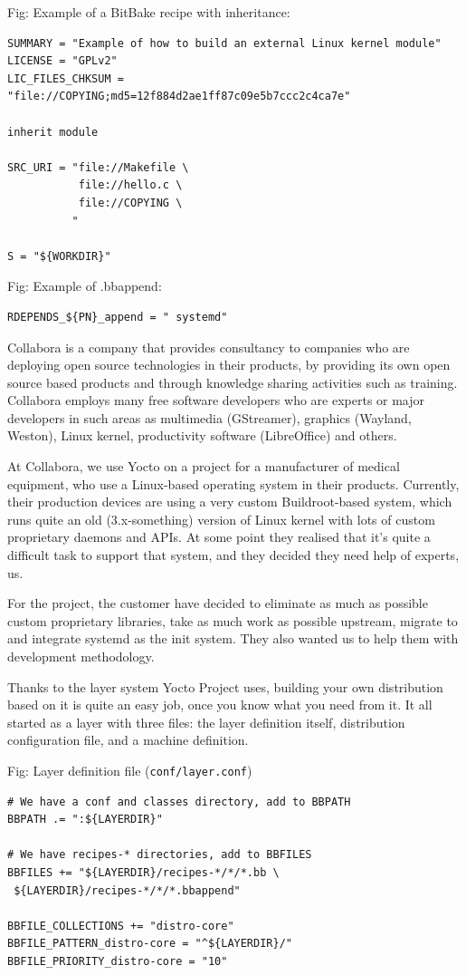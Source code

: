 \documentclass[10pt, a5paper]{article}
\begin{document}
Fig: Example of a BitBake recipe with inheritance:
\begin{lstlisting}
SUMMARY = "Example of how to build an external Linux kernel module"
LICENSE = "GPLv2"
LIC_FILES_CHKSUM = "file://COPYING;md5=12f884d2ae1ff87c09e5b7ccc2c4ca7e"

inherit module

SRC_URI = "file://Makefile \
           file://hello.c \
           file://COPYING \
          "

S = "${WORKDIR}"
\end{lstlisting}

Fig: Example of .bbappend:
\begin{lstlisting}
RDEPENDS_${PN}_append = " systemd"
\end{lstlisting}

Collabora is a company that provides consultancy to companies who are deploying open source technologies in their products, by providing its own open source based products and through knowledge sharing activities such as training. Collabora employs many free software \linebreak developers who are experts or major developers in such areas as \linebreak multimedia (GStreamer), graphics (Wayland, Weston), Linux kernel, productivity software (LibreOffice) and others.

At Collabora, we use Yocto on a project for a manufacturer of medical equipment, who use a Linux-based operating system in their products. Currently, their production devices are using a very custom Buildroot-based system, which runs quite an old (3.x-something) version of Linux kernel with lots of custom proprietary daemons and APIs. At some point they realised that it's quite a difficult task to support that system, and they decided they need help of experts, us.

For the project, the customer have decided to eliminate as much as possible custom proprietary libraries, take as much work as possible upstream, migrate to and integrate systemd as the init system. They also wanted us to help them with development methodology.

Thanks to the layer system Yocto Project uses, building your own distribution based on it is quite an easy job, once you know what you need from it. It all started as a layer with three files: the layer definition itself, distribution configuration file, and a machine definition.

Fig: Layer definition file (\verb!conf/layer.conf!)
\begin{lstlisting}
# We have a conf and classes directory, add to BBPATH
BBPATH .= ":${LAYERDIR}"

# We have recipes-* directories, add to BBFILES
BBFILES += "${LAYERDIR}/recipes-*/*/*.bb \
 ${LAYERDIR}/recipes-*/*/*.bbappend"
 
BBFILE_COLLECTIONS += "distro-core"
BBFILE_PATTERN_distro-core = "^${LAYERDIR}/"
BBFILE_PRIORITY_distro-core = "10"
\end{lstlisting}
\end{document}
